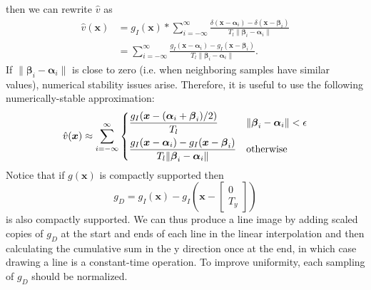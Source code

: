 \documentclass{article}
\let\V\boldsymbol
\begin{document}
then we can rewrite $\hat v$ as
\begin{align*}
\hat v(\V x) &= g_I(\V x)*\sum_{i=-\infty}^{\infty}\frac{\delta(\V x - \V \alpha_i) - \delta(\V x - \V \beta_i)}{T_l\|\V\beta_i - \V\alpha_i\|}\\
&= \sum_{i=-\infty}^{\infty}\frac{g_I(\V x - \V \alpha_i) - g_I(\V x - \V \beta_i)}{T_l\|\V\beta_i - \V\alpha_i\|}.
\end{align*}
If $\|\V\beta_i - \V\alpha_i\|$ is close to zero (i.e. when neighboring samples have similar values), numerical stability issues arise.  Therefore, it is useful to use the following numerically-stable approximation:
\[
\hat v(\V x) \approx \sum_{i=-\infty}^{\infty}
\begin{dcases}
\frac{g_I(\V x - (\V \alpha_i + \V \beta_i)/2)}{T_l} & \|\V\beta_i - \V\alpha_i\| < \epsilon\\
\frac{g_I(\V x - \V \alpha_i) - g_I(\V x - \V \beta_i)}{T_l\|\V\beta_i - \V\alpha_i\|} & \text{otherwise}
\end{dcases}
\]
Notice that if $g(\V x)$ is compactly supported then
\[
g_D = g_I(\V x) - g_I\left(\V x - \begin{bmatrix}0\\T_y\end{bmatrix}\right)
\]
is also compactly supported.  We can thus produce a line image by adding scaled copies of $g_D$ at the start and ends of each line in the linear interpolation and then calculating the cumulative sum in the y direction once at the end, in which case drawing a line is a constant-time operation.  To improve uniformity, each sampling of $g_D$ should be normalized.
\end{document}
